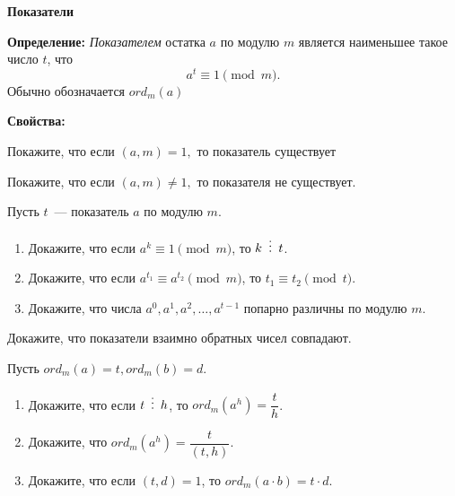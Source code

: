 \documentclass{article}
\begin{document}
    \large

    \begin{center}
        \textbf{Показатели}
    \end{center}

    \textbf{Определение:} \textit{Показателем} остатка $a$ по модулю $m$ является наименьшее такое число $t$, что \[a^t \equiv 1 \pmod m.\] Обычно обозначается $ord_m(a)$

    \textbf{Свойства:}

    \begin{enumerate_boxed}

        \item Покажите, что если $(a,m) = 1,$ то показатель существует

        \item Покажите, что если $(a,m) \neq 1,$ то показателя не существует.

        \item Пусть $t$~--- показатель $a$ по модулю $m$.
        \begin{enumerate}

            \item Докажите, что если $a^{k} \equiv 1 \pmod m$, то $k \,\,\,\vdots\,\,\, t$.

            \item Докажите, что если $a^{t_1} \equiv a^{t_2}  \pmod m$, то $t_1 \equiv t_2  \pmod t$.

            \item Докажите, что числа $a^0, a^1, a^2, \dotsc , a^{t-1}$ попарно различны по модулю $m$.

        \end{enumerate}

        \item Докажите, что показатели взаимно обратных чисел совпадают.

        \item Пусть $ord_m(a) = t,  ord_m(b) = d$.
        \begin{enumerate}

            \item Докажите, что если $t \,\,\,\vdots\,\,\, h$, то $ord_m (a^h) = \dfrac{t}{h}$.

            \item Докажите, что $ord_m (a^h) = \dfrac{t}{(t,h)}$.

            \item Докажите, что если $(t, d) = 1$, то $ord_m (a\cdot b) = t \cdot d$.

        \end{enumerate}

    \end{enumerate_boxed}
\end{document}
